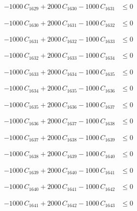 \documentclass[a4paper,11pt]{article}
\begin{document}
\begin{align}
-1000\,C_{1629} + 2000\,C_{1630} - 1000\,C_{1631} &\leq 0 \nonumber
\end{align}

\begin{align}
-1000\,C_{1630} + 2000\,C_{1631} - 1000\,C_{1632} &\leq 0 \nonumber
\end{align}

\begin{align}
-1000\,C_{1631} + 2000\,C_{1632} - 1000\,C_{1633} &\leq 0 \nonumber
\end{align}

\begin{align}
-1000\,C_{1632} + 2000\,C_{1633} - 1000\,C_{1634} &\leq 0 \nonumber
\end{align}

\begin{align}
-1000\,C_{1633} + 2000\,C_{1634} - 1000\,C_{1635} &\leq 0 \nonumber
\end{align}

\begin{align}
-1000\,C_{1634} + 2000\,C_{1635} - 1000\,C_{1636} &\leq 0 \nonumber
\end{align}

\begin{align}
-1000\,C_{1635} + 2000\,C_{1636} - 1000\,C_{1637} &\leq 0 \nonumber
\end{align}

\begin{align}
-1000\,C_{1636} + 2000\,C_{1637} - 1000\,C_{1638} &\leq 0 \nonumber
\end{align}

\begin{align}
-1000\,C_{1637} + 2000\,C_{1638} - 1000\,C_{1639} &\leq 0 \nonumber
\end{align}

\begin{align}
-1000\,C_{1638} + 2000\,C_{1639} - 1000\,C_{1640} &\leq 0 \nonumber
\end{align}

\begin{align}
-1000\,C_{1639} + 2000\,C_{1640} - 1000\,C_{1641} &\leq 0 \nonumber
\end{align}

\begin{align}
-1000\,C_{1640} + 2000\,C_{1641} - 1000\,C_{1642} &\leq 0 \nonumber
\end{align}

\begin{align}
-1000\,C_{1641} + 2000\,C_{1642} - 1000\,C_{1643} &\leq 0 \nonumber
\end{align}
\end{document}
